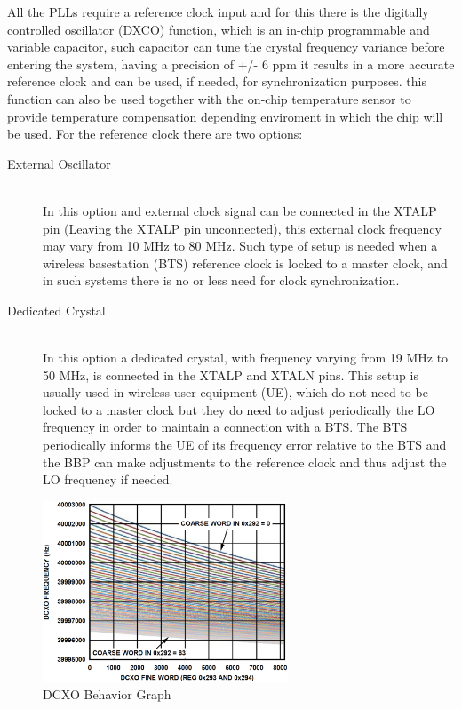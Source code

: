 All the PLLs require a reference clock input and for this there is the digitally
controlled oscillator (DXCO) function, which is an in-chip programmable and
variable capacitor, such capacitor can tune the crystal frequency variance
before entering the system, having a precision of +/- 6 ppm it results in a more
accurate reference clock and can be used, if needed, for synchronization
purposes. this function can also be used together with the on-chip temperature
sensor to provide temperature compensation depending enviroment in which the
chip will be used. For the reference clock there are two options:

\begin{description}
	\item[External Oscillator] \hfill \\
	In this option and external clock signal can be connected in the XTALP pin
(Leaving the XTALP pin unconnected), this external clock frequency may vary from
10 MHz to 80 MHz. Such type of setup is needed when a wireless basestation (BTS)
reference clock is locked to a master clock, and in such systems there is no or
less need for clock synchronization.

	\item[Dedicated Crystal] \hfill \\
	In this option a dedicated crystal, with frequency varying from 19 MHz to 50
MHz, is connected in the XTALP and XTALN pins. This setup is usually used in
wireless user equipment (UE), which do not need to be locked to a master clock
but they do need to adjust periodically the LO frequency in order to maintain a
connection with a BTS. The BTS periodically informs the UE of its frequency
error relative to the BTS and the BBP can make adjustments to the reference
clock and thus adjust the LO frequency if needed.

\end{description}

\begin{figure}[htbp]
    \centering
    \includegraphics[width=0.65\textwidth]{./figures/dcxo_graph}
    \caption{ DCXO Behavior Graph
    \label{fig:pll}}
\end{figure}

